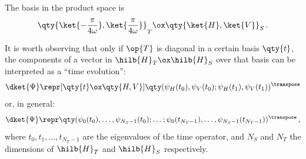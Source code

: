 The basis in the product space is
\begin{equation}\label{eq:moreva:t_overall_basis}
  \qty{\ket{-\frac{\pi}{4\omega}}, \ket{\frac{\pi}{4\omega}}}_T \ox \qty{\ket{H}, \ket{V}}_S
  \, \text{.}
\end{equation}

It is worth observing that
only if $\op{T}$ is diagonal in a certain basis $\qty{t}$,
the components of a vector in $\hilb{H}_T \ox \hilb{H}_S$
over that basis
can be interpreted as a ``time evolution'':
\begin{equation}\label{eq:timepicks2}
  \dket{\Psi}
  \repr[\qty{t} \ox \qty{H,V}]
  \qty(\psi_H(t_0), \psi_V(t_0); \psi_H(t_1), \psi_V(t_1))^\transpose
\end{equation}
or, in general:
\begin{equation}\label{eq:timepicksN}
  \dket{\Psi}
  \repr
  \qty(
    \psi_0(t_0),
    \dotsc,
    \psi_{N_{S} - 1}(t_0);
    \dots;
    \psi_0(t_{N_{T}-1}),
    \dotsc,
    \psi_{N_{S} - 1}(t_{N_{T}-1})
  )^\transpose \,\text{,}
\end{equation}
where
$t_0, t_1, \dots, t_{N_{T}-1}$ are the eigenvalues of the time operator,
and
$N_{S}$ and $N_{T}$ the dimensions of $\hilb{H}_T$ and $\hilb{H}_S$ respectively.

